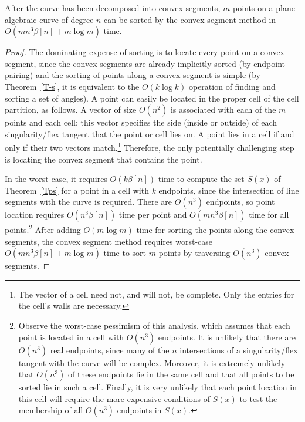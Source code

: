 \begin{theorem}
After the curve has been decomposed into convex segments,
$m$ points on a plane algebraic curve of degree $n$ can be sorted
by the convex segment method in $O(m n^{3} \beta[n] + m\log m)$ time.
\end{theorem}
%
\begin{proof}
The dominating expense of sorting is to locate every point on a convex 
segment,
since the convex segments are already implicitly sorted (by 
endpoint pairing) and 
the sorting of points along a convex segment is simple
(by Theorem~\ref{T-s}, it is equivalent to the $O(k \log k)$ operation 
of finding
and sorting a set of angles). 
A point can easily be located in the proper cell of the cell partition, 
as follows.
A vector of size $O(n^{2})$ is associated with each of the $m$ points 
and each
cell: this vector specifies the side (inside or outside) of each 
singularity/flex tangent
that the point or cell lies on.
A point lies in a cell if and only if their two vectors match.\footnote{The
	vector
	of a cell need not, and will not, be complete.  Only the entries 
	for the
	cell's walls are necessary.}
Therefore, the only potentially challenging step is locating the convex 
segment
that contains the point.

In the worst case, it requires $O(k \beta[n])$ time to compute the set 
$S(x)$ of Theorem~\ref{Tps} for a point in a cell with $k$ endpoints, since
the intersection of line segments with the curve is required.
There are $O(n^{3})$ endpoints, so point location requires 
$O(n^{3}\beta[n])$ time per
point and $O(mn^{3}\beta[n])$ time for all points.\footnote{Observe the 
	worst-case
	pessimism of this analysis, which assumes that each point is 
	located in a cell
	with $O(n^{3})$ endpoints.
	It is unlikely that there are $O(n^{3})$
	real endpoints, since many of the $n$ intersections of a 
	singularity/flex
	tangent with the curve will be complex.  
	Moreover, it is extremely unlikely that $O(n^{3})$
	of these endpoints lie in the same cell and that all points to 
	be sorted
	lie in such a cell.
	Finally, it is very unlikely that each point location in this 
	cell will 
	require the more expensive conditions
	of $S(x)$ to test the membership of all $O(n^{3})$ endpoints in 
	$S(x)$.}
After adding $O(m \log m)$ time for sorting the points along the convex 
segments,
the convex segment method requires worst-case 
$O(mn^{3}\beta[n] + m \log m)$ 
time to sort $m$ points by traversing $O(n^{3})$ convex segments.
\end{proof}

